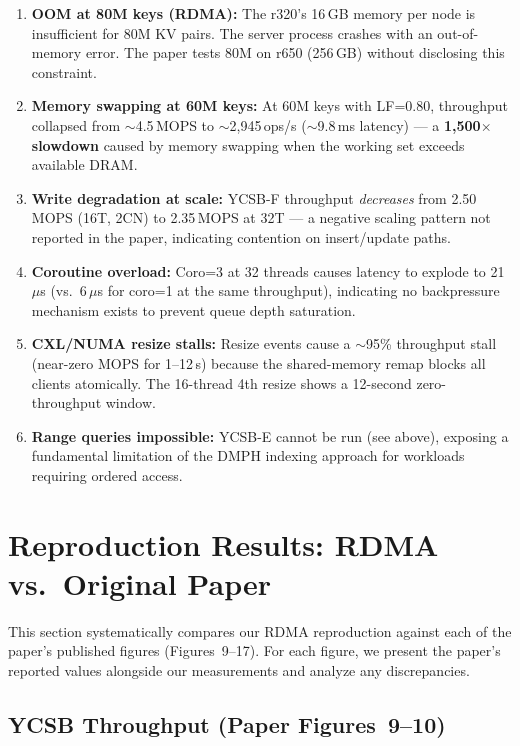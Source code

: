 \documentclass[conference]{IEEEtran}
\begin{document}
\begin{enumerate}[nosep]
  \item \textbf{OOM at 80M keys (RDMA):} The r320's 16\,GB memory per node is insufficient for 80M KV pairs. The server process crashes with an out-of-memory error. The paper tests 80M on r650 (256\,GB) without disclosing this constraint.
  \item \textbf{Memory swapping at 60M keys:} At 60M keys with LF=0.80, throughput collapsed from $\sim$4.5\,MOPS to $\sim$2,945\,ops/s ($\sim$9.8\,ms latency) --- a \textbf{1,500$\times$ slowdown} caused by memory swapping when the working set exceeds available DRAM.
  \item \textbf{Write degradation at scale:} YCSB-F throughput \emph{decreases} from 2.50\,MOPS (16T, 2CN) to 2.35\,MOPS at 32T --- a negative scaling pattern not reported in the paper, indicating contention on insert/update paths.
  \item \textbf{Coroutine overload:} Coro=3 at 32 threads causes latency to explode to 21\,$\mu$s (vs.\ 6\,$\mu$s for coro=1 at the same throughput), indicating no backpressure mechanism exists to prevent queue depth saturation.
  \item \textbf{CXL/NUMA resize stalls:} Resize events cause a $\sim$95\% throughput stall (near-zero MOPS for 1--12\,s) because the shared-memory remap blocks all clients atomically. The 16-thread 4th resize shows a 12-second zero-throughput window.
  \item \textbf{Range queries impossible:} YCSB-E cannot be run (see above), exposing a fundamental limitation of the DMPH indexing approach for workloads requiring ordered access.
\end{enumerate}

\section{Reproduction Results: RDMA vs.\ Original Paper}

This section systematically compares our RDMA reproduction against each of the paper's published figures (Figures~9--17). For each figure, we present the paper's reported values alongside our measurements and analyze any discrepancies.

\subsection{YCSB Throughput (Paper Figures~9--10)}\label{sec:repro-ycsb}
\end{document}
